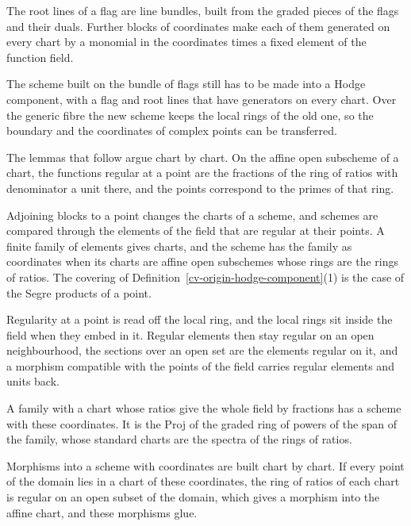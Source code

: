 The root lines of a flag are line bundles, built from the graded pieces of the flags and their duals. Further blocks of
coordinates make each of them generated on every chart by a monomial in the coordinates times a fixed element of the
function field.

The scheme built on the bundle of flags still has to be made into a Hodge component, with a flag and root lines
that have generators on every chart. Over the generic fibre the new scheme keeps the local rings of the old one,
so the boundary and the coordinates of complex points can be transferred.

The lemmas that follow argue chart by chart. On the affine open subscheme of a chart, the functions regular at a point
are the fractions of the ring of ratios with denominator a unit there, and the points correspond to the primes of that
ring.

Adjoining blocks to a point changes the charts of a scheme, and schemes are compared through the elements of the
field that are regular at their points. A finite family of elements gives charts, and the scheme has the family as
coordinates when its charts are affine open subschemes whose rings are the rings of ratios. The covering of
Definition~\ref{cv-origin-hodge-component}(1) is the case of the Segre products of a point.

Regularity at a point is read off the local ring, and the local rings sit inside the field when they embed in it.
Regular elements then stay regular on an open neighbourhood, the sections over an open set are the elements regular
on it, and a morphism compatible with the points of the field carries regular elements and units back.

A family with a chart whose ratios give the whole field by fractions has a scheme with these coordinates. It is the
Proj of the graded ring of powers of the span of the family, whose standard charts are the spectra of the rings of
ratios.

Morphisms into a scheme with coordinates are built chart by chart. If every point of the domain lies in a chart of
these coordinates, the ring of ratios of each chart is regular on an open subset of the domain, which gives a
morphism into the affine chart, and these morphisms glue.

